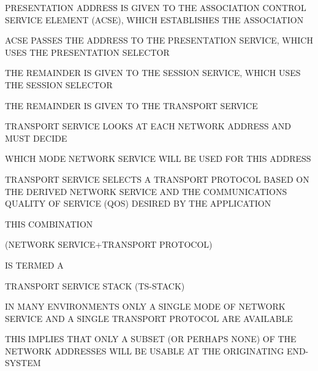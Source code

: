 \begin{bwslide}

\begin{nrtc}
\item	PRESENTATION ADDRESS IS GIVEN TO THE ASSOCIATION CONTROL SERVICE
	ELEMENT (ACSE), WHICH ESTABLISHES THE ASSOCIATION

\item	ACSE PASSES THE ADDRESS TO THE PRESENTATION SERVICE,
	WHICH USES THE PRESENTATION SELECTOR

\item	THE REMAINDER IS GIVEN TO THE SESSION SERVICE,
	WHICH USES THE SESSION SELECTOR

\item	THE REMAINDER IS GIVEN TO THE TRANSPORT SERVICE
\end{nrtc}
\end{bwslide}


\begin{bwslide}

\begin{nrtc}
\item	TRANSPORT SERVICE LOOKS AT EACH NETWORK ADDRESS AND MUST DECIDE
    \begin{nrtc}
    \item	WHICH MODE NETWORK SERVICE WILL BE USED FOR THIS ADDRESS
    \end{nrtc}

\item	TRANSPORT SERVICE SELECTS A TRANSPORT PROTOCOL BASED ON THE
	DERIVED NETWORK SERVICE AND THE COMMUNICATIONS QUALITY OF SERVICE (QOS)
	DESIRED BY THE APPLICATION

\item	THIS COMBINATION
    \begin{nrtc}
    \item	 (NETWORK SERVICE+TRANSPORT PROTOCOL)
    \end{nrtc}
	IS TERMED A
    \begin{nrtc}
    \item	TRANSPORT SERVICE STACK (TS-STACK)
    \end{nrtc}
\end{nrtc}
\end{bwslide}


\begin{bwslide}

\begin{nrtc}
\item	IN MANY ENVIRONMENTS ONLY A SINGLE MODE OF NETWORK SERVICE AND A
	SINGLE TRANSPORT PROTOCOL ARE AVAILABLE 

\item	THIS IMPLIES THAT ONLY A SUBSET (OR PERHAPS NONE) OF THE
	NETWORK ADDRESSES WILL BE USABLE AT THE ORIGINATING END-SYSTEM
\end{nrtc}
\end{bwslide}


